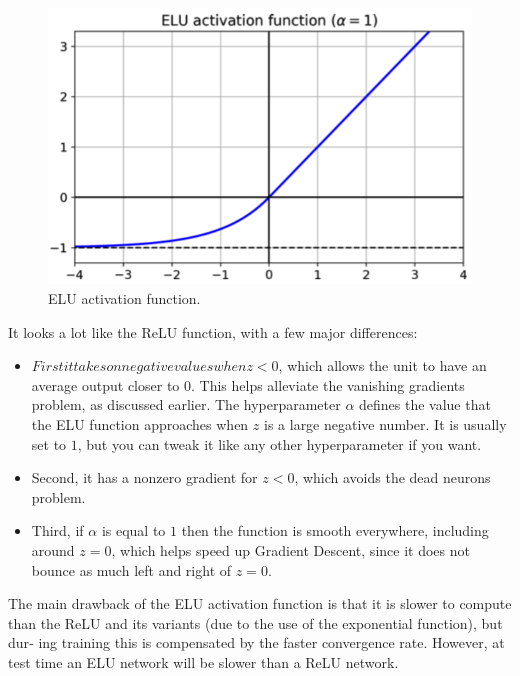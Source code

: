 \documentclass[12pt, letterpaper]{article}
\theoremstyle{definition}
\begin{document}
\begin{figure}
\centering
\includegraphics[scale=0.4]{img/ELU}
\caption{ELU activation function.}
\end{figure}
It looks a lot like the ReLU function, with a few major differences:
\begin{itemize}
\item$ First it takes on negative values when z < 0$, which allows the unit to have an average output closer to $0$. This helps alleviate the vanishing gradients problem, as discussed earlier. The hyperparameter $\alpha$ defines the value that the ELU function approaches when $z$ is a large negative number. It is usually set to $1$, but you can tweak it like any other hyperparameter if you want.
\item Second, it has a nonzero gradient for $z < 0$, which avoids the dead neurons problem.
\item Third, if $\alpha$ is equal to $1$ then the function is smooth everywhere, including around $z = 0$, which helps speed up Gradient Descent, since it does not bounce as much left and right of $z = 0$.
\end{itemize}
The main drawback of the ELU activation function is that it is slower to compute than the ReLU and its variants (due to the use of the exponential function), but dur‐ ing training this is compensated by the faster convergence rate. However, at test time an ELU network will be slower than a ReLU network.
\end{document}
